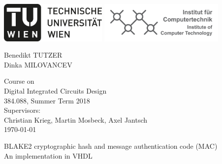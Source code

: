 \documentclass[%
	a4paper,
]
{article}
\begin{document}
%
\begin{titlepage}

	\begin{center}

	\includegraphics[height=2cm]{fig/logo-tu-bw.png}%
	\hfill{}%
	\includegraphics[height=2cm]{fig/logo-ict.png}%
	

	\vspace{5em}


		\large
		Benedikt TUTZER\\
		Dinka MILOVANCEV\\
	

	\vspace{5em}

		Course on \\[1em]
		{\huge Digital Integrated Circuits Design}\\[1em]
		{\Large 384.088, Summer Term 2018} \\[2em]
		{\large Supervisors:\\[.5em]
			Christian Krieg, Martin Mosbeck, Axel Jantsch} \\[5em]

		\today
		\vspace{5em}

		{\Huge BLAKE2 cryptographic hash and message authentication code (MAC)}\\[2em]
		{\Large An implementation in VHDL}

		\vspace{3em}
	\end{center}


\begin{abstract}

We implemented \emph{BLAKE2b} and \emph{BLAKE2s} hash function as specified in
RFC 7693. We used state machines to implement \emph{BLAKE2}.
Functional correctness is verified by comparing the produced output to the
reference implementation given in C. Our test bench compares the output of our
entity with the reference hash value for the same message input and reports
the result to stdout. A minimal design for the Digilent NEXYS 4 DDR board was
developed to prove that the blake2 cores are synthesizable and work as expected.
\end{abstract}
\end{titlepage}
\end{document}
